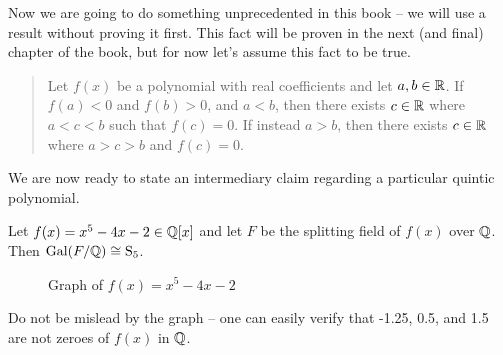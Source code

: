 Now we are going to do something unprecedented in this book -- we will use a result without proving it first. This fact will be proven in the next (and final) chapter of the book, but for now let's assume this fact to be true.
\begin{quote}
    Let $f(x)$ be a polynomial with real coefficients and let $a, b \in \mathbb{R}$. If $f(a) < 0$ and $f(b) > 0$, and $a < b$, then there exists $c \in \mathbb{R}$ where $a < c < b$ such that $f(c) = 0$. If instead $a > b$, then there exists $c \in \mathbb{R}$ where $a > c > b$ and $f(c) = 0$.
\end{quote}

We are now ready to state an intermediary claim regarding a particular quintic polynomial.

\begin{proposition}
    Let $f(x) = x^5 - 4x - 2 \in \mathbb{Q}[x]$ and let $F$ be the splitting field of $f(x)$ over $\mathbb{Q}$. Then $\mathrm{Gal}(F/\mathbb{Q}) \cong \mathrm{S}_{5}$.
\end{proposition}

\begin{figure}[H]
    \centering
    \caption{Graph of $f(x) = x^5 - 4x - 2$}
\end{figure}

Do not be mislead by the graph -- one can easily verify that -1.25, 0.5, and 1.5 are not zeroes of $f(x)$ in $\mathbb{Q}$.

